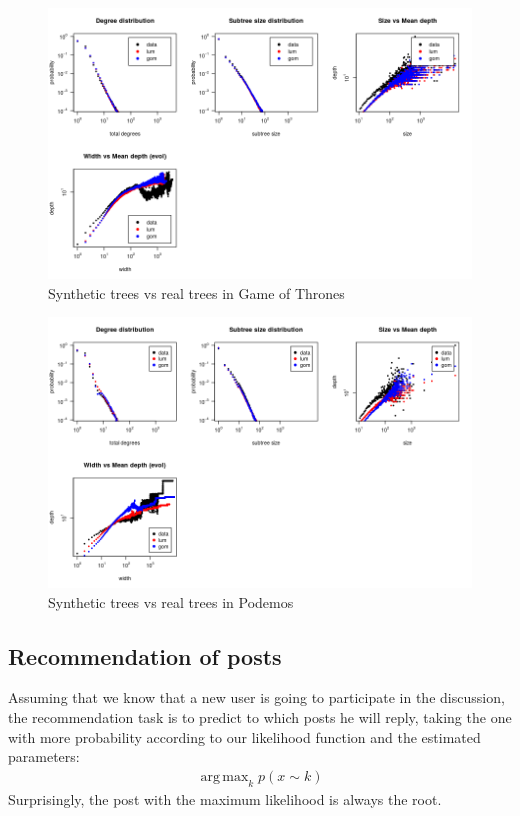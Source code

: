 \documentclass[smallextended]{svjour3}          %
\DeclareMathOperator*{\argmax}{arg\,max}
\begin{document}
\begin{figure}
\center
\includegraphics[width=1\textwidth]{benchmark_structures_gof}
\caption{Synthetic trees vs real trees in Game of Thrones}
\end{figure}
\begin{figure}
\center
\includegraphics[width=1\textwidth]{benchmark_structures_podemos}
\caption{Synthetic trees vs real trees in Podemos}
\end{figure}

\subsection{Recommendation of posts}
Assuming that we know that a new user is going to participate in the discussion, the recommendation task is to predict to which posts he will reply, taking the one with more probability according to our likelihood function and the estimated parameters:
\begin{align*}
\argmax_k p(x \sim k)
\end{align*}
Surprisingly, the post with the maximum likelihood is always the root.
\end{document}
